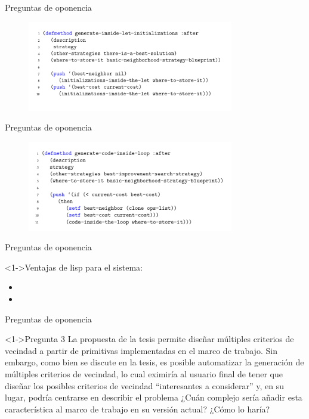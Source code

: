 \begin{frame}{Preguntas de oponencia}
	\onslide<1->\begin{figure}
		\includegraphics[width=9cm]{img/inisde-let.png}
	\end{figure}
\end{frame}

\begin{frame}{Preguntas de oponencia}
	\onslide<1->\begin{figure}
		\includegraphics[width=9cm]{img/inside-loop.png}
	\end{figure}
\end{frame}

\begin{frame}{Preguntas de oponencia}
	\begin{block}<1->{Ventajas de lisp para el sistema:}
		\begin{itemize}
			\item {}
			\item {}
		\end{itemize}
	\end{block}
	
\end{frame}

\begin{frame}{Preguntas de oponencia}
	\begin{block}<1->{Pregunta 3}
		La propuesta de la tesis permite diseñar múltiples criterios de vecindad a partir de primitivas implementadas en el marco de trabajo. Sin embargo, como bien se discute en la tesis, es posible automatizar la generación de múltiples criterios de vecindad, lo cual eximiría al usuario final de tener que diseñar los posibles criterios de vecindad “interesantes a considerar” y, en su lugar, podría centrarse en describir el problema ¿Cuán complejo sería añadir esta característica al marco de trabajo en su versión actual? ¿Cómo lo haría?
	\end{block}
	
\end{frame}


